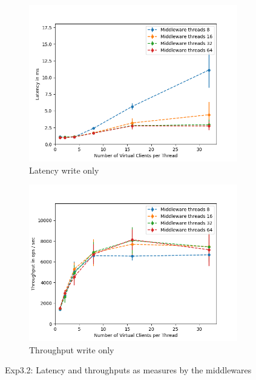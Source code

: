 \documentclass[11pt,a4paper]{article}
\begin{document}

\begin{figure}[H]
\centering
\begin{subfigure}{.5\textwidth}
    \centering
    \includegraphics[width=\textwidth]{img/exp3_2/exp3_2__latency_middleware_write_1.png}
    \caption{Latency write only}
    \label{fig:mesh1}
\end{subfigure}%
\begin{subfigure}{.5\textwidth}
      \centering
    \includegraphics[width=\textwidth]{img/exp3_2/exp3_2__throughput_middleware_write_1.png}
    \caption{Throughput write only}
    \label{fig:mesh1}
\end{subfigure}
\caption{Exp3.2: Latency and throughputs as measures by the middlewares}
\label{fig:test}
\end{figure}
\end{document}
